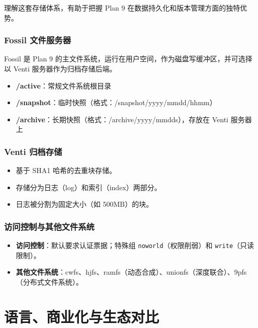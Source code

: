 \documentclass[12pt,UTF8]{ctexbook}
\begin{document}
理解这套存储体系，有助于把握 Plan 9 在数据持久化和版本管理方面的独特优势。

\section{Fossil 文件服务器}

Fossil 是 Plan 9 的主文件系统，运行在用户空间，作为磁盘写缓冲区，并可选择以 Venti 服务器作为归档存储后端。

\begin{itemize}
\item \textbf{/active}：常规文件系统根目录
\item \textbf{/snapshot}：临时快照（格式：/snapshot/yyyy/mmdd/hhmm）
\item \textbf{/archive}：长期快照（格式：/archive/yyyy/mmdds），存放在 Venti 服务器上
\end{itemize}

\section{Venti 归档存储}

\begin{itemize}
\item 基于 SHA1 哈希的去重块存储。
\item 存储分为日志（log）和索引（index）两部分。
\item 日志被分割为固定大小（如 500MB）的块。
\end{itemize}

\section{访问控制与其他文件系统}

\begin{itemize}
\item \textbf{访问控制}：默认要求认证票据；特殊组 \texttt{noworld}（权限削弱）和 \texttt{write}（只读限制）。
\item \textbf{其他文件系统}：cwfs、hjfs、ramfs（动态合成）、unionfs（深度联合）、9pfs（分布式文件系统）。
\end{itemize}


\part{语言、商业化与生态对比}
\end{document}
